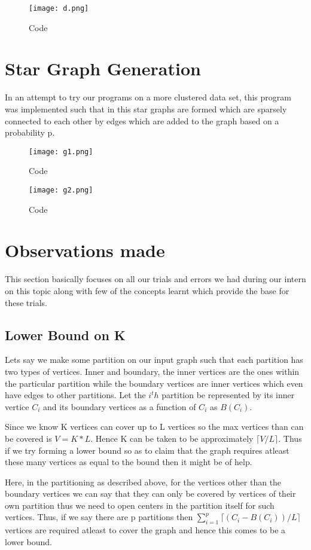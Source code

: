 \documentclass[12pt,a4paper,onecolumn]{article}
\begin{document}
\begin{figure}[H]
 \texttt{[image: d.png]}
  \caption{Code}
  \label{Figure 7}
\end{figure}

\section{Star Graph Generation}
In an attempt to try our programs on a more clustered data set, this program was implemented such that in this star graphs are formed which are sparsely connected to each other by edges which are added to the graph based on a probability p.

\begin{figure}[H]
 \texttt{[image: g1.png]}
  \caption{Code}
  \label{Figure 8}
\end{figure}

\begin{figure}[H]
 \texttt{[image: g2.png]}
  \caption{Code}
  \label{Figure 9}
\end{figure}

\section{Observations made}
This section basically focuses on all our trials and errors we had during our intern on this topic along with few of the concepts learnt which provide the base for these trials.
\subsection{Lower Bound on K}
Lets say we make some partition on our input graph such that each partition has two types of vertices. Inner and boundary, the inner vertices are the ones within the particular partition while the boundary vertices are inner vertices which even have edges to other partitions. Let the $i^th$ partition be represented by its inner vertice $C_i$ and its boundary vertices as a function of $C_i$ as $B(C_i)$.

Since we know K vertices can cover up to L vertices so the max vertices than can be covered is $V = K*L$. Hence K can be taken to be approximately $\lceil V/L\rceil$. Thus if we try forming a lower bound so as to claim that the graph requires atleast these many vertices as equal to the bound then it might be of help. 

Here, in the partitioning as described above, for the vertices other than the boundary vertices we can say that they can only be covered by vertices of their own partition thus we need to open centers in the partition itself for such vertices. Thus, if we say there are p partitions then $\sum_{i=1}^{p}\lceil (C_i-B(C_i))/L\rceil$ vertices are required atleast to cover the graph and hence this comes to be a lower bound. 
\end{document}

